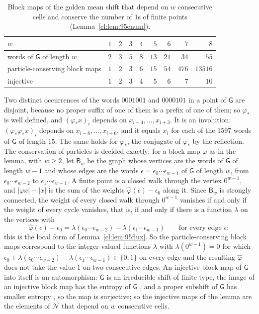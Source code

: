 \begin{table}[ht]
\centering
\begin{tabular}{lrrrrrrrr}
\toprule
$w$&$1$&$2$&$3$&$4$&$5$&$6$&$7$&$8$\\
\midrule
words of $\mathsf G$ of length $w$&$2$&$3$&$5$&$8$&$13$&$21$&$34$&$55$\\
particle-conserving block maps&$1$&$2$&$3$&$6$&$15$&$54$&$476$&$13516$\\
injective&$1$&$2$&$3$&$4$&$5$&$6$&$7$&$10$\\
\bottomrule
\end{tabular}
\caption{Block maps of the golden mean shift that depend on $w$ consecutive cells and conserve the number of $1$s of finite points (Lemma~\ref{cl:lem:95enum}).}\label{cl:tab:95enum}
\end{table}

Two distinct occurrences of the words $0001001$ and $0000101$ in a point of $\mathsf G$ are disjoint, because no proper suffix of one of them is a prefix of one of them; so $\varphi_{\ast}$ is well defined, and $(\varphi_{\ast}x)_i$ depends on $x_{i-4},\dots,x_{i+3}$. It is an involution: $(\varphi_{\ast}\varphi_{\ast}x)_i$ depends on $x_{i-8},\dots,x_{i+6}$, and it equals $x_i$ for each of the $1597$ words of $\mathsf G$ of length $15$. The same holds for $\bar\varphi_{\ast}$, the conjugate of $\varphi_{\ast}$ by the reflection. The conservation of particles is decided exactly: for a block map $\varphi$ as in the lemma, with $w\ge2$, let $\mathsf B_w$ be the graph whose vertices are the words of $\mathsf G$ of length $w-1$ and whose edges are the words $\epsilon=\epsilon_0\cdots\epsilon_{w-1}$ of $\mathsf G$ of length $w$, from $\epsilon_0\cdots\epsilon_{w-2}$ to $\epsilon_1\cdots\epsilon_{w-1}$. A finite point is a closed walk through the vertex $0^{w-1}$, and $|\varphi x|-|x|$ is the sum of the weights $\hat\varphi(\epsilon)-\epsilon_0$ along it. Since $\mathsf B_w$ is strongly connected, the weight of every closed walk through $0^{w-1}$ vanishes if and only if the weight of every cycle vanishes, that is, if and only if there is a function $\lambda$ on the vertices with
\[
\hat\varphi(\epsilon)-\epsilon_0=\lambda(\epsilon_0\cdots\epsilon_{w-2})-\lambda(\epsilon_1\cdots\epsilon_{w-1})\qquad\text{for every edge }\epsilon;
\]
this is the local form of Lemma~\ref{cl:lem:95flux}. So the particle-conserving block maps correspond to the integer-valued functions $\lambda$ with $\lambda(0^{w-1})=0$ for which $\epsilon_0+\lambda(\epsilon_0\cdots\epsilon_{w-2})-\lambda(\epsilon_1\cdots\epsilon_{w-1})\in\{0,1\}$ on every edge and the resulting $\hat\varphi$ does not take the value $1$ on two consecutive edges. An injective block map of $\mathsf G$ into itself is an automorphism: $\mathsf G$ is an irreducible shift of finite type, the image of an injective block map has the entropy of $\mathsf G$ \cite[Corollary~8.1.20]{LM1995}, and a proper subshift of $\mathsf G$ has smaller entropy \cite[Corollary~4.4.9]{LM1995}, so the map is surjective; so the injective maps of the lemma are the elements of $\mathcal N$ that depend on $w$ consecutive cells.

